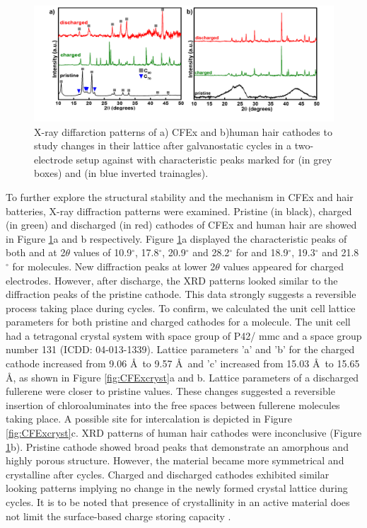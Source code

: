 \documentclass{article}
\begin{document}
\begin{figure}[h!]
  \centering
  \includegraphics[width=\textwidth]{fig/XRD}
    \caption{X-ray diffarction patterns of a) CFEx and b)human hair cathodes to study changes in their lattice after galvanostatic cycles in a two-electrode setup against  with characteristic peaks marked for  (in grey boxes) and  (in blue inverted trainagles).}
  \label{fig:XRD}
\end{figure}

To further explore the structural stability and the mechanism in CFEx and hair batteries, X-ray diffraction patterns were examined. Pristine (in black), charged (in green) and discharged (in red) cathodes of CFEx and human hair are showed in Figure \ref{fig:XRD}a and b respectively. Figure \ref{fig:XRD}a displayed the characteristic peaks of both  and  at 2$\theta$ values of 10.9$^{\circ}$, 17.8$^{\circ}$, 20.9$^{\circ}$ and 28.2$^{\circ}$ for  and 18.9$^{\circ}$, 19.3$^{\circ}$ and 21.8$^{\circ}$ for  molecules. New diffraction peaks at lower 2$\theta$ values appeared for charged electrodes. However, after discharge, the XRD patterns looked similar to the diffraction peaks of the pristine cathode. This data strongly suggests a reversible process taking place during cycles. To confirm, we calculated the unit cell lattice parameters for both pristine and charged cathodes for a  molecule. The unit cell had a tetragonal crystal system with space group of P42/ mmc and a space group number 131 (ICDD: 04-013-1339). Lattice parameters 'a' and 'b' for the charged cathode increased from 9.06 \AA\ to 9.57 \AA\ and 'c' increased from 15.03 \AA\ to 15.65 \AA, as shown in Figure \ref{fig:CFExcryst}a and b. Lattice parameters of a discharged fullerene were closer to pristine values. These changes suggested a reversible insertion of chloroaluminates into the free spaces between fullerene molecules taking place. A possible site for  intercalation is depicted in Figure \ref{fig:CFExcryst}c. XRD patterns of human hair cathodes were inconclusive (Figure \ref{fig:XRD}b). Pristine cathode showed broad peaks that demonstrate an amorphous and highly porous structure. However, the material became more symmetrical and crystalline after cycles. Charged and discharged cathodes exhibited similar looking patterns implying no change in the newly formed crystal lattice during cycles. It is to be noted that presence of crystallinity in an active material does not limit the surface-based charge storing capacity \cite{kim_synthesis_2006, jow_factors_2018}. 
\end{document}
